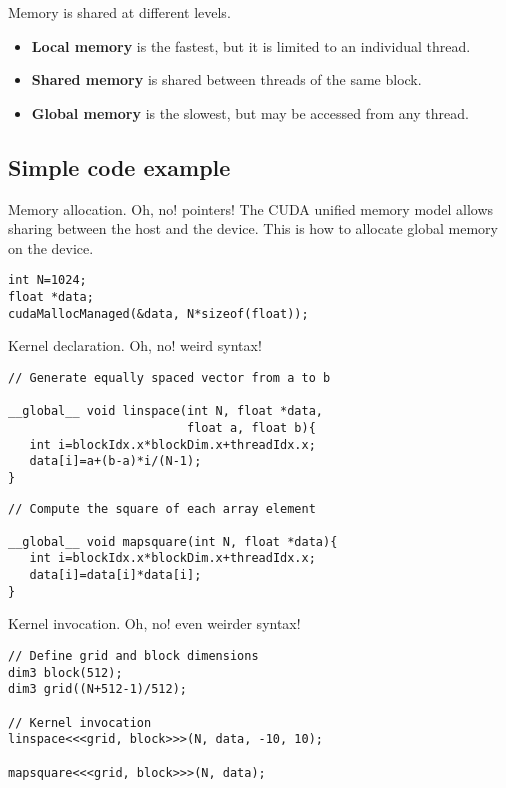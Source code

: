 \documentclass[xcolor={dvipsnames}]{beamer}
\begin{document}
\begin{frame}{Memory is shared at different levels.}
\begin{itemize}[<+->]
\item \textbf{Local memory} is the fastest, but it is limited to an individual thread.

\bigskip
\item \textbf{Shared memory} is shared between threads of the same block.

\bigskip
\item \textbf{Global memory} is the slowest, but may be accessed from any thread.
\end{itemize}
\end{frame}

\subsection{Simple code example}
\begin{frame}[fragile]{Memory allocation. Oh, no! pointers!}
The CUDA unified memory model allows sharing between the host and the device. This is how to allocate global memory on the device.

\begin{lstlisting}
int N=1024;
float *data;
cudaMallocManaged(&data, N*sizeof(float));
\end{lstlisting}
\end{frame}

\begin{frame}[fragile]{Kernel declaration. Oh, no! weird syntax!}
\begin{lstlisting}
// Generate equally spaced vector from a to b

__global__ void linspace(int N, float *data,
                         float a, float b){
   int i=blockIdx.x*blockDim.x+threadIdx.x;
   data[i]=a+(b-a)*i/(N-1);
}
\end{lstlisting}
\pause
\begin{lstlisting}
// Compute the square of each array element

__global__ void mapsquare(int N, float *data){
   int i=blockIdx.x*blockDim.x+threadIdx.x;
   data[i]=data[i]*data[i];
}
\end{lstlisting}	
\end{frame}

\begin{frame}[fragile]{Kernel invocation. Oh, no! even weirder syntax!}
\begin{lstlisting}
// Define grid and block dimensions
dim3 block(512);
dim3 grid((N+512-1)/512);

// Kernel invocation
linspace<<<grid, block>>>(N, data, -10, 10);

mapsquare<<<grid, block>>>(N, data);
\end{lstlisting}
\end{frame}
\end{document}
